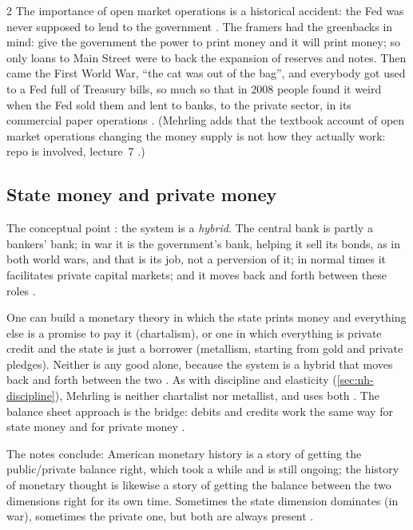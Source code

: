 \begin{paracol}{2}
The importance of open market operations is a historical accident: the Fed was never supposed to lend to the government
. The framers had the greenbacks in mind: give the government the power to print money and it will print money; so only
loans to Main Street were to back the expansion of reserves and notes. Then came the First World War, ``the cat was out of the bag'', and
everybody got used to a Fed full of Treasury bills, so much so that in 2008 people found it weird when the Fed sold them and lent to banks,
to the private sector, in its commercial paper operations . (Mehrling adds that the textbook
account of open market operations changing the money supply is not how they actually work: repo is involved, lecture~7
.)

\subsection{State money and private money}
The conceptual point : the system is a \emph{hybrid}. The central bank is partly a bankers' bank; in war it is the
government's bank, helping it sell its bonds, as in both world wars, and that is its job, not a perversion of it; in normal times it
facilitates private capital markets; and it moves back and forth between these roles .

\begin{intuition}
One can build a monetary theory in which the state prints money and everything else is a promise to pay it (chartalism), or one in which
everything is private credit and the state is just a borrower (metallism, starting from gold and private pledges). Neither is any good
alone, because the system is a hybrid that moves back and forth between the two . As with
discipline and elasticity (\cref{sec:nh-discipline}), Mehrling is neither chartalist nor metallist, and uses both
. The balance sheet approach is the bridge: debits and credits work the same way for state money and for
private money .
\end{intuition}

The notes conclude: American monetary history is a story of getting the public/private balance right, which took a while and is still ongoing;
the history of monetary thought is likewise a story of getting the balance between the two dimensions right for its own time. Sometimes the state
dimension dominates (in war), sometimes the private one, but both are always present .


\end{paracol}
